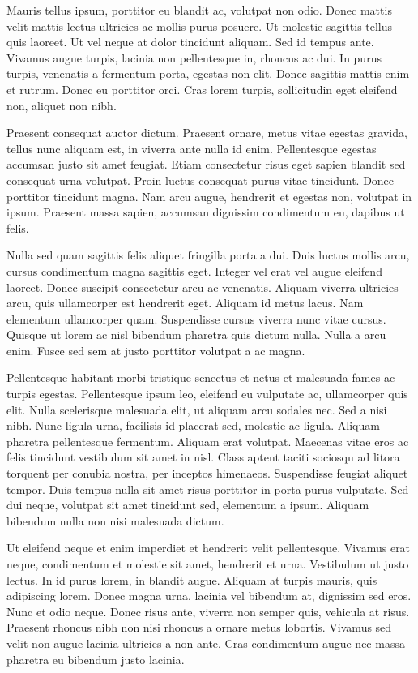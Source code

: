 \documentclass[a4paper]{article}
\begin{document}
Mauris tellus ipsum, porttitor eu blandit ac, volutpat non odio. Donec mattis velit mattis lectus ultricies ac mollis purus posuere. Ut molestie sagittis tellus quis laoreet. Ut vel neque at dolor tincidunt aliquam. Sed id tempus ante. Vivamus augue turpis, lacinia non pellentesque in, rhoncus ac dui. In purus turpis, venenatis a fermentum porta, egestas non elit. Donec sagittis mattis enim et rutrum. Donec eu porttitor orci. Cras lorem turpis, sollicitudin eget eleifend non, aliquet non nibh.

Praesent consequat auctor dictum. Praesent ornare, metus vitae egestas gravida, tellus nunc aliquam est, in viverra ante nulla id enim. Pellentesque egestas accumsan justo sit amet feugiat. Etiam consectetur risus eget sapien blandit sed consequat urna volutpat. Proin luctus consequat purus vitae tincidunt. Donec porttitor tincidunt magna. Nam arcu augue, hendrerit et egestas non, volutpat in ipsum. Praesent massa sapien, accumsan dignissim condimentum eu, dapibus ut felis.

Nulla sed quam sagittis felis aliquet fringilla porta a dui. Duis luctus mollis arcu, cursus condimentum magna sagittis eget. Integer vel erat vel augue eleifend laoreet. Donec suscipit consectetur arcu ac venenatis. Aliquam viverra ultricies arcu, quis ullamcorper est hendrerit eget. Aliquam id metus lacus. Nam elementum ullamcorper quam. Suspendisse cursus viverra nunc vitae cursus. Quisque ut lorem ac nisl bibendum pharetra quis dictum nulla. Nulla a arcu enim. Fusce sed sem at justo porttitor volutpat a ac magna.

Pellentesque habitant morbi tristique senectus et netus et malesuada fames ac turpis egestas. Pellentesque ipsum leo, eleifend eu vulputate ac, ullamcorper quis elit. Nulla scelerisque malesuada elit, ut aliquam arcu sodales nec. Sed a nisi nibh. Nunc ligula urna, facilisis id placerat sed, molestie ac ligula. Aliquam pharetra pellentesque fermentum. Aliquam erat volutpat. Maecenas vitae eros ac felis tincidunt vestibulum sit amet in nisl. Class aptent taciti sociosqu ad litora torquent per conubia nostra, per inceptos himenaeos. Suspendisse feugiat aliquet tempor. Duis tempus nulla sit amet risus porttitor in porta purus vulputate. Sed dui neque, volutpat sit amet tincidunt sed, elementum a ipsum. Aliquam bibendum nulla non nisi malesuada dictum.

Ut eleifend neque et enim imperdiet et hendrerit velit pellentesque. Vivamus erat neque, condimentum et molestie sit amet, hendrerit et urna. Vestibulum ut justo lectus. In id purus lorem, in blandit augue. Aliquam at turpis mauris, quis adipiscing lorem. Donec magna urna, lacinia vel bibendum at, dignissim sed eros. Nunc et odio neque. Donec risus ante, viverra non semper quis, vehicula at risus. Praesent rhoncus nibh non nisi rhoncus a ornare metus lobortis. Vivamus sed velit non augue lacinia ultricies a non ante. Cras condimentum augue nec massa pharetra eu bibendum justo lacinia.
\end{document}
